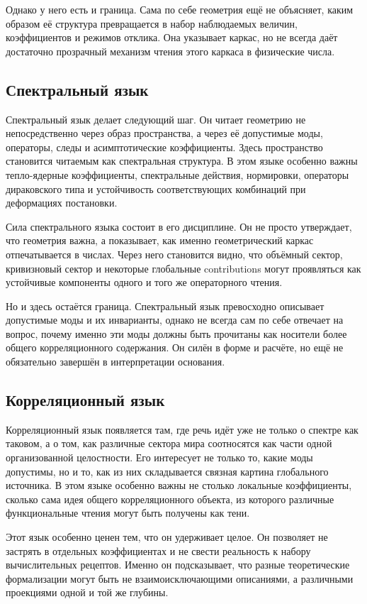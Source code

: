 \documentclass[12pt,a4paper]{article}
\begin{document}
Однако у него есть и граница. Сама по себе геометрия ещё не объясняет, каким образом её структура превращается в набор наблюдаемых величин, коэффициентов и режимов отклика. Она указывает каркас, но не всегда даёт достаточно прозрачный механизм чтения этого каркаса в физические числа.

\subsection{Спектральный язык}

Спектральный язык делает следующий шаг. Он читает геометрию не непосредственно через образ пространства, а через её допустимые моды, операторы, следы и асимптотические коэффициенты. Здесь пространство становится читаемым как спектральная структура. В этом языке особенно важны тепло-ядерные коэффициенты, спектральные действия, нормировки, операторы дираковского типа и устойчивость соответствующих комбинаций при деформациях постановки.

Сила спектрального языка состоит в его дисциплине. Он не просто утверждает, что геометрия важна, а показывает, как именно геометрический каркас отпечатывается в числах. Через него становится видно, что объёмный сектор, кривизновый сектор и некоторые глобальные contributions могут проявляться как устойчивые компоненты одного и того же операторного чтения.

Но и здесь остаётся граница. Спектральный язык превосходно описывает допустимые моды и их инварианты, однако не всегда сам по себе отвечает на вопрос, почему именно эти моды должны быть прочитаны как носители более общего корреляционного содержания. Он силён в форме и расчёте, но ещё не обязательно завершён в интерпретации основания.

\subsection{Корреляционный язык}

Корреляционный язык появляется там, где речь идёт уже не только о спектре как таковом, а о том, как различные сектора мира соотносятся как части одной организованной целостности. Его интересует не только то, какие моды допустимы, но и то, как из них складывается связная картина глобального источника. В этом языке особенно важны не столько локальные коэффициенты, сколько сама идея общего корреляционного объекта, из которого различные функциональные чтения могут быть получены как тени.

Этот язык особенно ценен тем, что он удерживает целое. Он позволяет не застрять в отдельных коэффициентах и не свести реальность к набору вычислительных рецептов. Именно он подсказывает, что разные теоретические формализации могут быть не взаимоисключающими описаниями, а различными проекциями одной и той же глубины.
\end{document}
